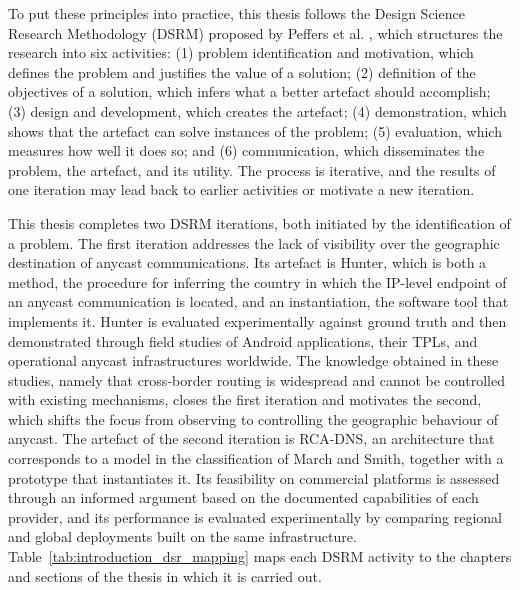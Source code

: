 To put these principles into practice, this thesis follows the Design Science Research Methodology (DSRM) proposed by Peffers et al. \cite{Peffers2007AResearch}, which structures the research into six activities: (1) problem identification and motivation, which defines the problem and justifies the value of a solution; (2) definition of the objectives of a solution, which infers what a better artefact should accomplish; (3) design and development, which creates the artefact; (4) demonstration, which shows that the artefact can solve instances of the problem; (5) evaluation, which measures how well it does so; and (6) communication, which disseminates the problem, the artefact, and its utility. The process is iterative, and the results of one iteration may lead back to earlier activities or motivate a new iteration.

This thesis completes two DSRM iterations, both initiated by the identification of a problem. The first iteration addresses the lack of visibility over the geographic destination of anycast communications. Its artefact is Hunter, which is both a method, the procedure for inferring the country in which the IP-level endpoint of an anycast communication is located, and an instantiation, the software tool that implements it. Hunter is evaluated experimentally against ground truth and then demonstrated through field studies of Android applications, their TPLs, and operational anycast infrastructures worldwide. The knowledge obtained in these studies, namely that cross-border routing is widespread and cannot be controlled with existing mechanisms, closes the first iteration and motivates the second, which shifts the focus from observing to controlling the geographic behaviour of anycast. The artefact of the second iteration is RCA-DNS, an architecture that corresponds to a model in the classification of March and Smith, together with a prototype that instantiates it. Its feasibility on commercial platforms is assessed through an informed argument based on the documented capabilities of each provider, and its performance is evaluated experimentally by comparing regional and global deployments built on the same infrastructure. Table~\ref{tab:introduction_dsr_mapping} maps each DSRM activity to the chapters and sections of the thesis in which it is carried out.

